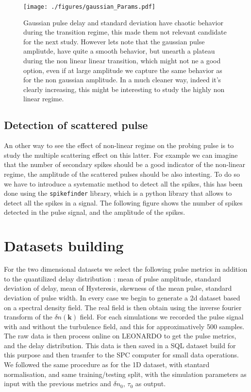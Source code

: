 \documentclass[11pt,a4paper,openany]{report}
\begin{document}
\begin{multicols}{2}
    \begin{figure}[H]
        \centering
        \texttt{[image: ./figures/gaussian\_Params.pdf]}
        \caption{Gaussian pulse delay and standard deviation have chaotic behavior during the transition regime, this made them not relevant candidate for the next study. However lets note that the gaussian pulse ampliutde,
            have quite a smooth behavior, but unearth a plateau during the non linear linear transition, which might not ne a good option, even if at large amplitude we capture the same behavior as for the non gaussian amplitude.
            In a much cleaner way, indeed it's clearly increasing, this might be interesting to study the highly non linear regime.}
        \label{}
    \end{figure}


    \subsection{Detection of scattered pulse}
    An other way to see the effect of non-linear regime on the probing pulse is to study the multiple scattering effect on this latter.
    For example we can imagine that the number of secondary spikes should be a good indicator of the non-linear regime, the amplitude of the scattered pulses should be also intesting. To do so we have to introduce a systematic method to detect all the spikes, this has been done using the \texttt{spikefinder} library, which is a python library that allows to detect all the spikes in a signal. The following figure shows the number of spikes detected in the pulse signal, and the amplitude of the spikes.

    \section{Datasets building}
    For the two dimensional datasets we select the following pulse metrics in addition to the quantilized delay distribution :  mean of pulse amplitude, standard deviation of delay, mean of Hysteresis, skewness of the mean pulse, standard deviation of pulse width. In every case we begin to generate a 2d dataset based on a spectral density field. The real field is then obtain using the inverse fourier transform of the $\delta n(\textbf{k} )$ field. For each simulations we recorded the pulse signal with and without the turbulence field, and this for approximatively 500 samples. The raw data is then process online on LEONARDO to get the pulse metrics, and the delay distribution. This data is then saved in a SQL dataset build for this purpose and then trasnfer to the SPC computer for small data operations. We followed the same procedure as for the 1D dataset, with stantard normalisation, and same training/testing split, with the simulation parameters as input with the previous metrics and $\delta n_0, \, \tau_0$ as output.


\end{multicols}
\end{document}
